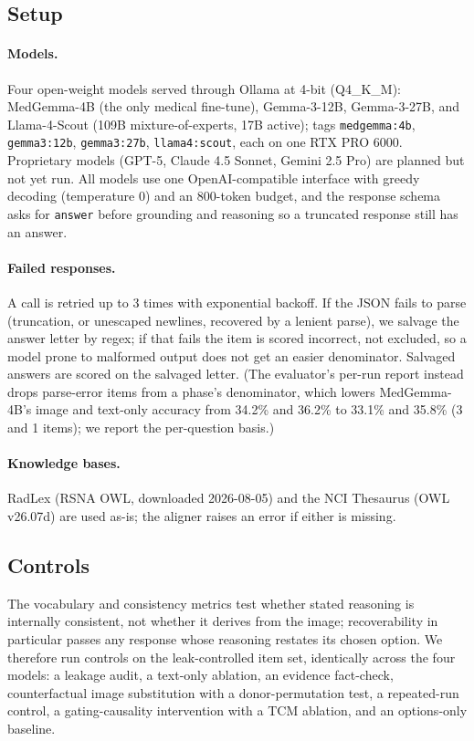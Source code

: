 \documentclass[11pt]{article}
\begin{document}
\subsection{Setup}
\label{sec:setup}

\paragraph{Models.} Four open-weight models served through Ollama at 4-bit (Q4\_K\_M): MedGemma-4B (the only medical fine-tune), Gemma-3-12B, Gemma-3-27B, and Llama-4-Scout (109B mixture-of-experts, 17B active); tags \texttt{medgemma:4b}, \texttt{gemma3:12b}, \texttt{gemma3:27b}, \texttt{llama4:scout}, each on one RTX PRO 6000. Proprietary models (GPT-5, Claude 4.5 Sonnet, Gemini 2.5 Pro) are planned but not yet run. All models use one OpenAI-compatible interface with greedy decoding (temperature $0$) and an $800$-token budget, and the response schema asks for \texttt{answer} before grounding and reasoning so a truncated response still has an answer.

\paragraph{Failed responses.} A call is retried up to 3 times with exponential backoff. If the JSON fails to parse (truncation, or unescaped newlines, recovered by a lenient parse), we salvage the answer letter by regex; if that fails the item is scored incorrect, not excluded, so a model prone to malformed output does not get an easier denominator. Salvaged answers are scored on the salvaged letter. (The evaluator's per-run report instead drops parse-error items from a phase's denominator, which lowers MedGemma-4B's image and text-only accuracy from 34.2\% and 36.2\% to 33.1\% and 35.8\% (3 and 1 items); we report the per-question basis.)

\paragraph{Knowledge bases.} RadLex (RSNA OWL, downloaded 2026-08-05) and the NCI Thesaurus \citep{sioutos2007nci} (OWL v26.07d) are used as-is; the aligner raises an error if either is missing.

\subsection{Controls}
\label{sec:grounding-test}

The vocabulary and consistency metrics test whether stated reasoning is internally consistent, not whether it derives from the image; recoverability in particular passes any response whose reasoning restates its chosen option. We therefore run controls on the leak-controlled item set, identically across the four models: a leakage audit, a text-only ablation, an evidence fact-check, counterfactual image substitution with a donor-permutation test, a repeated-run control, a gating-causality intervention with a TCM ablation, and an options-only baseline.
\end{document}
